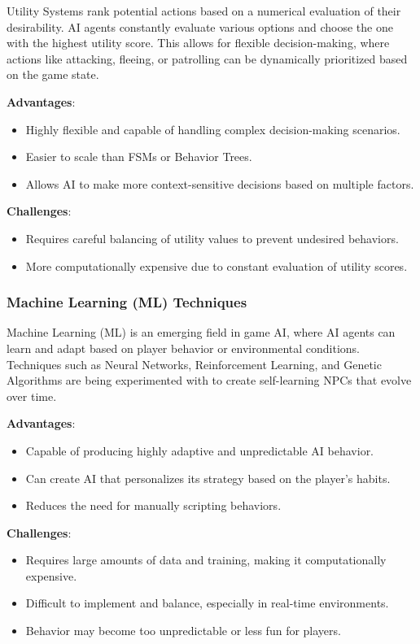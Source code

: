 Utility Systems rank potential actions based on a numerical evaluation of their desirability. AI agents constantly evaluate various options and choose the one with the highest utility score. This allows for flexible decision-making, where actions like attacking, fleeing, or patrolling can be dynamically prioritized based on the game state.

\textbf{Advantages}:
\begin{itemize}
    \item Highly flexible and capable of handling complex decision-making scenarios.
    \item Easier to scale than FSMs or Behavior Trees.
    \item Allows AI to make more context-sensitive decisions based on multiple factors.
\end{itemize}

\textbf{Challenges}:
\begin{itemize}
    \item Requires careful balancing of utility values to prevent undesired behaviors.
    \item More computationally expensive due to constant evaluation of utility scores.
\end{itemize}

\subsubsection{Machine Learning (ML) Techniques}

Machine Learning (ML) is an emerging field in game AI, where AI agents can learn and adapt based on player behavior or environmental conditions. Techniques such as Neural Networks, Reinforcement Learning, and Genetic Algorithms are being experimented with to create self-learning NPCs that evolve over time.

\textbf{Advantages}:
\begin{itemize}
    \item Capable of producing highly adaptive and unpredictable AI behavior.
    \item Can create AI that personalizes its strategy based on the player's habits.
    \item Reduces the need for manually scripting behaviors.
\end{itemize}

\textbf{Challenges}:
\begin{itemize}
    \item Requires large amounts of data and training, making it computationally expensive.
    \item Difficult to implement and balance, especially in real-time environments.
    \item Behavior may become too unpredictable or less fun for players.
\end{itemize}

